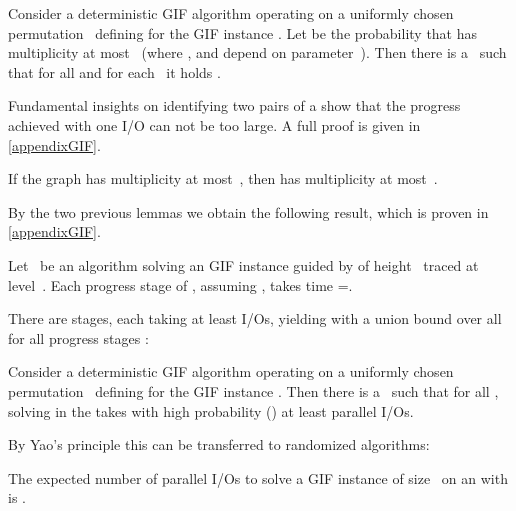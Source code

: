\documentclass[envcountsame]{llncs}
\def\bO#1{\printmath{\mathcal{O}\left(#1\right)}}
\def\bOm#1{\printmath{\Omega \left(#1\right)}}
\begin{document}
\begin{lemma}\label{lemmaMultiplicity}
Consider a deterministic GIF algorithm operating on a uniformly chosen permutation~ defining \binaryTreeOf{\gifInstance} for the GIF instance \gifInstance. 
	Let  be the probability that  has multiplicity at most~ (where , and \levelOfTracedAtoms  depend on parameter~\memorySize).
	Then there is a~ such that for all  and for each~ it holds .
\end{lemma}

Fundamental insights on identifying two pairs of a  show that the progress achieved with one I/O can not be too large.
A full proof is given in \autoref{appendixGIF}.

\begin{lemma}\label{lemmaQuadruple}
  If the graph  has multiplicity at most~, then  has multiplicity at most~.
\end{lemma}

By the two previous lemmas we obtain the following result, which is proven in \autoref{appendixGIF}.

\begin{lemma}
	\label{lemmaGIFProgress}
  Let~ be an algorithm solving an GIF instance \gifInstance guided by \binaryTreeOf{\gifInstance} of height~ traced at level~.
  Each progress stage  of , assuming , takes time =\bOm{\log M}.
\end{lemma}

There are \bO{\log\inputSize} stages, each taking at least \bOm{\log\inputSize} I/Os, yielding with a union bound over all  for all progress stages :

\begin{lemma}
	Consider a deterministic GIF algorithm operating on a uniformly chosen permutation~ defining \binaryTreeOf{\gifInstance} for the GIF instance \gifInstance. 
	Then there is a~ such that for all , solving \gifInstance in the \fusePEM takes with high probability () at least \bOm{\log^2 \inputSize} parallel I/Os.
\end{lemma}


By Yao's principle \cite{1977YaosPrinciple} this can be transferred to randomized algorithms: 

\begin{theorem}
  The expected number of parallel I/Os to solve a GIF instance of size~ on an \fusePEM with  is \bOm{\log^2 \inputSize}.
\end{theorem}
\end{document}
